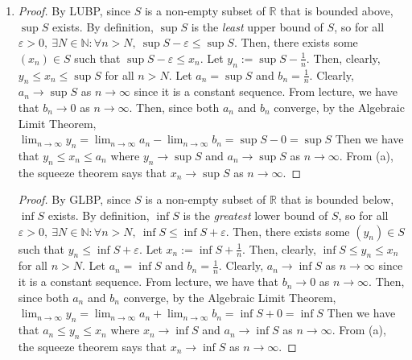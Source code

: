 \documentclass[13pt]{article}
\begin{document}
\begin{enumerate}[label=(\alph*)]
\item
  \begin{proof}
    By LUBP, since $S$ is a non-empty subset of $\mathbb{R}$ that is
    bounded above, $\sup{S}$ exists. By definition, $\sup{S}$ is the
    \textit{least} upper bound of $S$, so for all $\varepsilon >
    0, \ \exists N \in \mathbb{N} : \forall n > N, \ \sup{S} -
    \varepsilon \leq \sup{S}$. Then, there exists some $(x_n) \in S$
    such that $\sup{S} - \varepsilon \leq x_n$. Let $y_n :=
    \sup{S} - \frac{1}{n}$. Then, clearly, $y_n \leq
    x_n \leq \sup{S}$ for all $n > N$. Let $a_n = \sup{S}$ and $b_n =
    \frac{1}{n}$. Clearly, $a_n \rightarrow \sup{S}$ as $n
    \rightarrow \infty$ since it is a constant sequence. From
    lecture, we have that $b_n \rightarrow 0$ as $n \rightarrow
    \infty$. Then, since both $a_n$ and $b_n$ converge, by 
    the Algebraic Limit Theorem, $\lim_{n \rightarrow \infty} y_n =
    \lim_{n \rightarrow \infty} a_n - \lim_{n \rightarrow \infty} b_n
    = \sup{S} - 0 = \sup{S}$ Then we have that $y_n \leq x_n \leq
    a_n$ where $y_n \rightarrow \sup{S}$ and $a_n \rightarrow \sup{S}$
    as $n \rightarrow \infty$. From (a), the squeeze theorem says that $x_n \rightarrow
    \sup{S}$ as $n \rightarrow \infty$.  
  \end{proof}
  \begin{proof}
    By GLBP, since $S$ is a non-empty subset of $\mathbb{R}$ that is
    bounded below, $\inf{S}$ exists. By definition, $\inf{S}$ is the
    \textit{greatest} lower bound of $S$, so for all $\varepsilon > 0,
    \ \exists N \in \mathbb{N} : \forall n > N, \ \inf{S} \leq \inf{S}
    + \varepsilon$. Then, there exists some $(y_n) \in S$ such that
    $y_n \leq \inf{S} + \varepsilon$. Let $x_n := \inf{S} +
    \frac{1}{n}$. Then, clearly, $\inf{S} \leq y_n \leq x_n$ for all
    $n > N$. Let $a_n = \inf{S}$ and $b_n = \frac{1}{n}$. Clearly,
    $a_n \rightarrow \inf{S}$ as $n \rightarrow \infty$ since it is a
    constant sequence. From lecture, we have that $b_n \rightarrow 0$
    as $n \rightarrow \infty$. Then, since both $a_n$ and $b_n$ converge, by 
    the Algebraic Limit Theorem, $\lim_{n \rightarrow \infty} y_n =
    \lim_{n \rightarrow \infty} a_n + \lim_{n \rightarrow \infty} b_n
    = \inf{S} + 0 = \inf{S}$ Then we have that $a_n \leq y_n \leq
    x_n$ where $x_n \rightarrow \inf{S}$ and $a_n \rightarrow \inf{S}$
    as $n \rightarrow \infty$. From (a), the squeeze theorem says that
    $x_n \rightarrow \inf{S}$ as $n \rightarrow \infty$.  
  \end{proof}
\end{enumerate}
\end{document}
